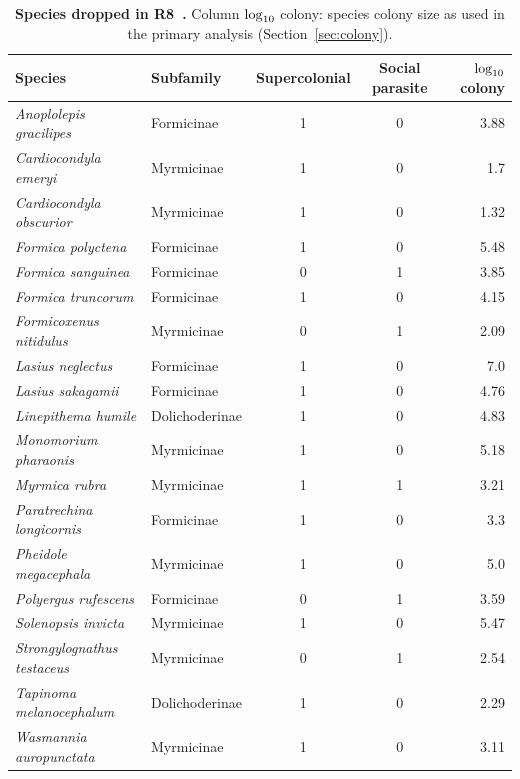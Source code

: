 \begin{table}[htbp]
\centering
\caption[Species dropped in R8]{\textbf{Species dropped in R8~\citep[Supplementary Table~21]{bellroberts2024}.} Column $\log_{10}$ colony: species colony size as used in the primary analysis (Section~\ref{sec:colony}).}
\label{tab:S8}
\footnotesize
\begin{tabular}{@{}llccr@{}}
\toprule
Species & Subfamily & Supercolonial & Social parasite & $\log_{10}$ colony \\
\midrule
\emph{Anoplolepis gracilipes} & Formicinae & 1 & 0 & 3.88 \\
\emph{Cardiocondyla emeryi} & Myrmicinae & 1 & 0 & 1.7 \\
\emph{Cardiocondyla obscurior} & Myrmicinae & 1 & 0 & 1.32 \\
\emph{Formica polyctena} & Formicinae & 1 & 0 & 5.48 \\
\emph{Formica sanguinea} & Formicinae & 0 & 1 & 3.85 \\
\emph{Formica truncorum} & Formicinae & 1 & 0 & 4.15 \\
\emph{Formicoxenus nitidulus} & Myrmicinae & 0 & 1 & 2.09 \\
\emph{Lasius neglectus} & Formicinae & 1 & 0 & 7.0 \\
\emph{Lasius sakagamii} & Formicinae & 1 & 0 & 4.76 \\
\emph{Linepithema humile} & Dolichoderinae & 1 & 0 & 4.83 \\
\emph{Monomorium pharaonis} & Myrmicinae & 1 & 0 & 5.18 \\
\emph{Myrmica rubra} & Myrmicinae & 1 & 1 & 3.21 \\
\emph{Paratrechina longicornis} & Formicinae & 1 & 0 & 3.3 \\
\emph{Pheidole megacephala} & Myrmicinae & 1 & 0 & 5.0 \\
\emph{Polyergus rufescens} & Formicinae & 0 & 1 & 3.59 \\
\emph{Solenopsis invicta} & Myrmicinae & 1 & 0 & 5.47 \\
\emph{Strongylognathus testaceus} & Myrmicinae & 0 & 1 & 2.54 \\
\emph{Tapinoma melanocephalum} & Dolichoderinae & 1 & 0 & 2.29 \\
\emph{Wasmannia auropunctata} & Myrmicinae & 1 & 0 & 3.11 \\
\bottomrule
\end{tabular}
\end{table}
